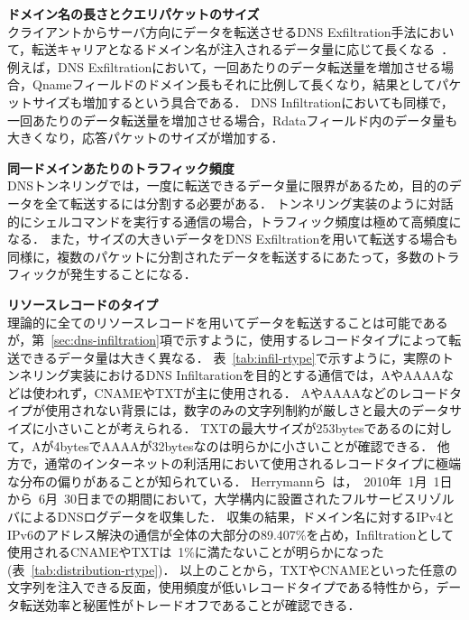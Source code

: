 \hspace{-12pt}\textbf{ドメイン名の長さとクエリパケットのサイズ}\\
\hspace{12pt}クライアントからサーバ方向にデータを転送させるDNS Exfiltration手法において，転送キャリアとなるドメイン名が注入されるデータ量に応じて長くなる~\cite{vern}．
例えば，DNS Exfiltrationにおいて，一回あたりのデータ転送量を増加させる場合，Qnameフィールドのドメイン長もそれに比例して長くなり，結果としてパケットサイズも増加するという具合である．
DNS Infiltrationにおいても同様で，一回あたりのデータ転送量を増加させる場合，Rdataフィールド内のデータ量も大きくなり，応答パケットのサイズが増加する．



\hspace{-12pt}\textbf{同一ドメインあたりのトラフィック頻度}\\
\hspace{12pt}DNSトンネリングでは，一度に転送できるデータ量に限界があるため，目的のデータを全て転送するには分割する必要がある．
トンネリング実装のように対話的にシェルコマンドを実行する通信の場合，トラフィック頻度は極めて高頻度になる．
また，サイズの大きいデータをDNS Exfiltrationを用いて転送する場合も同様に，複数のパケットに分割されたデータを転送するにあたって，多数のトラフィックが発生することになる．\newline

\hspace{-12pt}\textbf{リソースレコードのタイプ}\\
\hspace{12pt}理論的に全てのリソースレコードを用いてデータを転送することは可能であるが，第~\ref{sec:dns-infiltration}項で示すように，使用するレコードタイプによって転送できるデータ量は大きく異なる．
表~\ref{tab:infil-rtype}で示すように，実際のトンネリング実装におけるDNS Infiltarationを目的とする通信では，AやAAAAなどは使われず，CNAMEやTXTが主に使用される．
AやAAAAなどのレコードタイプが使用されない背景には，数字のみの文字列制約が厳しさと最大のデータサイズに小さいことが考えられる．
TXTの最大サイズが253bytesであるのに対して，Aが4bytesでAAAAが32bytesなのは明らかに小さいことが確認できる．
他方で，通常のインターネットの利活用において使用されるレコードタイプに極端な分布の偏りがあることが知られている．
Herrymannら~\cite{Herrymann}は，~2010年~1月~1日から~6月~30日までの期間において，大学構内に設置されたフルサービスリゾルバによるDNSログデータを収集した．
収集の結果，ドメイン名に対するIPv4とIPv6のアドレス解決の通信が全体の大部分の89.407\%を占め，Infiltrationとして使用されるCNAMEやTXTは~1\%に満たないことが明らかになった(表~\ref{tab:distribution-rtype})．
以上のことから，TXTやCNAMEといった任意の文字列を注入できる反面，使用頻度が低いレコードタイプである特性から，データ転送効率と秘匿性がトレードオフであることが確認できる．


